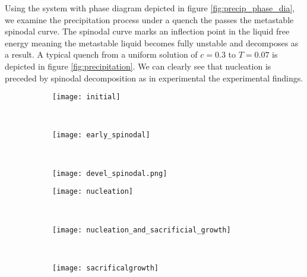 Using the system with phase diagram depicted in figure
\ref{fig:precip_phase_dia}, we examine the precipitation process under a quench
the passes the metastable spinodal curve. The spinodal curve marks an inflection
point in the liquid free energy meaning the metastable liquid becomes fully
unstable and decomposes as a result. A typical quench from a uniform solution
of $c = 0.3$ to $T = 0.07$ is depicted in figure \ref{fig:precipitation}. We
can clearly see that nucleation is preceded by spinodal decomposition as in
experimental the experimental findings. 
%
\begin{figure}
    \centering
    \begin{subfigure}[b]{0.3\textwidth}
        \texttt{[image: initial]}
        \label{fig:initial}
        \caption{}
    \end{subfigure}
    ~
    \begin{subfigure}[b]{0.3\textwidth}
        \texttt{[image: early\_spinodal]}
        \label{fig:early_spinodal}
        \caption{}
    \end{subfigure}
    ~
    \begin{subfigure}[b]{0.3\textwidth}
        \texttt{[image: devel\_spinodal.png]}
        \label{fig:devel_spinodal}
        \caption{}
    \end{subfigure}

    \vspace{0.25cm}
    \begin{subfigure}[b]{0.3\textwidth}
        \texttt{[image: nucleation]}
        \label{fig:nucleation}
        \caption{}
    \end{subfigure}
    ~
    \begin{subfigure}[b]{0.3\textwidth}
        \texttt{[image: nucleation\_and\_sacrificial\_growth]}
        \label{fig:nucleation_and_growth}
        \caption{} 
    \end{subfigure}
    ~
    \begin{subfigure}[b]{0.3\textwidth}
        \texttt{[image: sacrificalgrowth]}
        \label{fig:sacrifical_growth}
        \caption{}
    \end{subfigure}
    

\end{figure}
